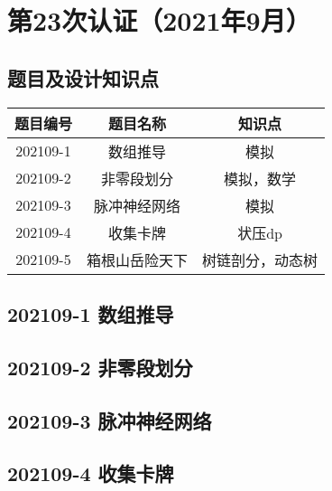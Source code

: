 \documentclass[cn,10pt,math=newtx,citestyle=gb7714-2015,bibstyle=gb7714-2015]{elegantbook}
\newif\ifonlyanalyze %
\begin{document}

\chapter{第23次认证（2021年9月）}

\section{题目及设计知识点}

\begin{table}[htbp]
    \centering
    \begin{tabular}{ccc}
        \toprule
        题目编号 & 题目名称       & 知识点           \\
        \midrule
        202109-1 & 数组推导       & 模拟             \\
        202109-2 & 非零段划分     & 模拟，数学       \\
        202109-3 & 脉冲神经网络   & 模拟             \\
        202109-4 & 收集卡牌       & 状压dp           \\
        202109-5 & 箱根山岳险天下 & 树链剖分，动态树 \\
        \bottomrule
    \end{tabular}
\end{table}

\newpage
\section{202109-1 数组推导}
\ifonlyanalyze
\else
    
\fi


\newpage
\section{202109-2 非零段划分}
\ifonlyanalyze
\else
    
\fi


\newpage
\section{202109-3 脉冲神经网络}
\ifonlyanalyze
\else
    
\fi


\newpage
\section{202109-4 收集卡牌}
\ifonlyanalyze
\else
    
\fi

\end{document}
